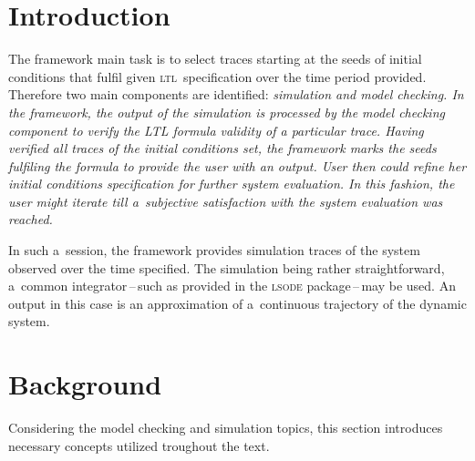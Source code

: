 \documentclass[12pt,twoside,draft]{fithesis}
\newcommand{\ltl}{\textsc{ltl}~}
\begin{document}
\FrontMatter
\ThesisTitlePage

\begin{ThesisDeclaration}
\DeclarationText
\AdvisorName
\end{ThesisDeclaration}




\MainMatter
\tableofcontents
\chapter{Introduction}
The framework main task is to select traces starting at the seeds of
initial conditions that fulfil given \ltl specification over the time
period provided. Therefore two main components are identified:
\em simulation and model checking\rm{}.
In the framework, the output of the simulation is processed by the
model checking component to verify the LTL formula validity of
a particular trace. Having verified all traces of the initial conditions
set, the framework marks the seeds fulfiling the formula to provide
the user with an output. User then could refine her initial conditions
specification for further system evaluation. In this fashion, the user
might iterate till a~subjective satisfaction with the system evaluation
was reached.

In such a~session, the framework provides simulation traces of the
system observed over the time specified. The simulation being rather
straightforward, a~common integrator\,--\,such as provided in the
\textsc{lsode} \cite{lsode} package\,--\,may be used.
An output in this case is an approximation of a~continuous trajectory
of the dynamic system.

\chapter{Background}
Considering the model checking and simulation topics, this section
introduces necessary concepts utilized troughout the text.
\end{document}
